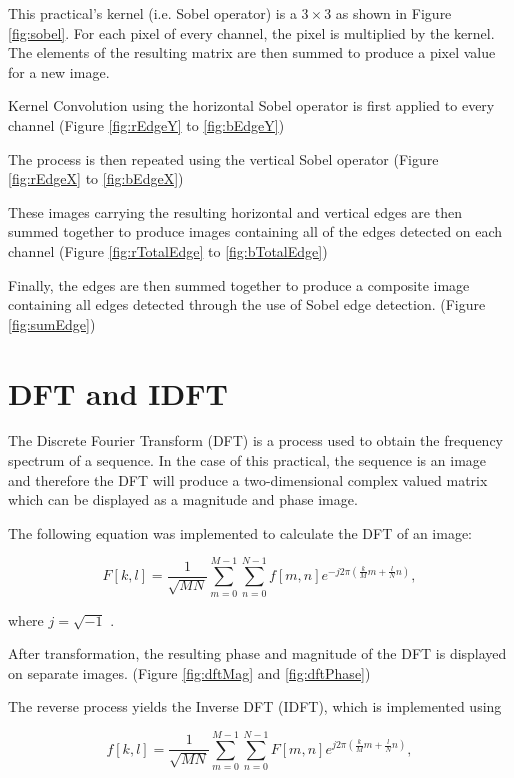 \documentclass[a4paper,12pt]{article}
\numberwithin{equation}{section} %
\numberwithin{figure}{section}
\begin{document}
This practical's kernel (i.e. Sobel operator) is a $ 3 \times 3$ as shown in Figure \ref{fig:sobel}. For each pixel of every channel, the pixel is multiplied by the kernel. The elements of the resulting matrix are then summed to produce a pixel value for a new image.

Kernel Convolution using the horizontal Sobel operator is first applied to every channel (Figure \ref{fig:rEdgeY} to \ref{fig:bEdgeY})


The process is then repeated using the vertical Sobel operator (Figure \ref{fig:rEdgeX} to \ref{fig:bEdgeX})


\pagebreak
These images carrying the resulting horizontal and vertical edges are then summed together to produce images containing all of the edges detected on each channel (Figure \ref{fig:rTotalEdge} to \ref{fig:bTotalEdge})


Finally, the edges are then summed together to produce a composite image containing all edges detected through the use of Sobel edge detection. (Figure \ref{fig:sumEdge})

\section{DFT and IDFT}
The Discrete Fourier Transform (DFT) is a process used to obtain the frequency spectrum of a sequence. In the case of this practical, the sequence is an image and therefore the DFT will produce a  two-dimensional complex valued matrix which can be displayed as a magnitude and phase image.

The following equation was implemented to calculate the DFT of an image:

\begin{Large}
\begin{equation}
	F[k,l] = \frac{1}{\sqrt{MN}}\sum_{m = 0}^{M-1} \sum_{n = 0}^{N-1} f[m,n] e^{-j 2 \pi (\frac{k}{M} m+ \frac{l}{N} n)},
\end{equation}
\end{Large}

where $ j = \sqrt{-1} $  \cite{pratt2001digital}.

After transformation, the resulting phase and magnitude of the DFT is displayed on separate images. (Figure \ref{fig:dftMag} and \ref{fig:dftPhase})



The reverse process yields the Inverse DFT (IDFT), which is implemented using

\begin{Large}
\begin{equation}
	f[k,l] = \frac{1}{\sqrt{MN}}\sum_{m = 0}^{M-1} \sum_{n = 0}^{N-1} F[m,n] e^{j 2 \pi (\frac{k}{M} m+ \frac{l}{N} n)},
\end{equation}
\end{Large}
\end{document}
